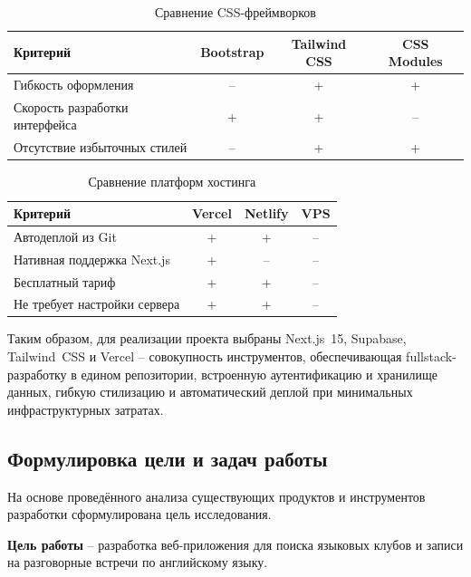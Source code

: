 \begin{table}[h]
\centering
\caption{Сравнение CSS-фреймворков}
\label{tab:css}
\begin{tabular}{|p{5.5cm}|c|c|c|}
\hline
\textbf{Критерий} & \textbf{Bootstrap} & \textbf{Tailwind CSS} & \textbf{CSS Modules} \\
\hline
Гибкость оформления & -- & + & + \\
\hline
Скорость разработки интерфейса & + & + & -- \\
\hline
Отсутствие избыточных стилей & -- & + & + \\
\hline
\end{tabular}
\end{table}

\begin{table}[h]
\centering
\caption{Сравнение платформ хостинга}
\label{tab:hosting}
\begin{tabular}{|p{5.5cm}|c|c|c|}
\hline
\textbf{Критерий} & \textbf{Vercel} & \textbf{Netlify} & \textbf{VPS} \\
\hline
Автодеплой из Git & + & + & -- \\
\hline
Нативная поддержка Next.js & + & -- & -- \\
\hline
Бесплатный тариф & + & + & -- \\
\hline
Не требует настройки сервера & + & + & -- \\
\hline
\end{tabular}
\end{table}

\clearpage

Таким образом, для реализации проекта выбраны Next.js~15, Supabase, Tailwind~CSS
и Vercel -- совокупность инструментов, обеспечивающая fullstack-разработку
в едином репозитории, встроенную аутентификацию и хранилище данных, гибкую
стилизацию и автоматический деплой при минимальных инфраструктурных затратах.

\subsection{Формулировка цели и задач работы}

На основе проведённого анализа существующих продуктов и инструментов разработки
сформулирована цель исследования.

\textbf{Цель работы} -- разработка веб-приложения для поиска языковых клубов
и записи на разговорные встречи по английскому языку.


